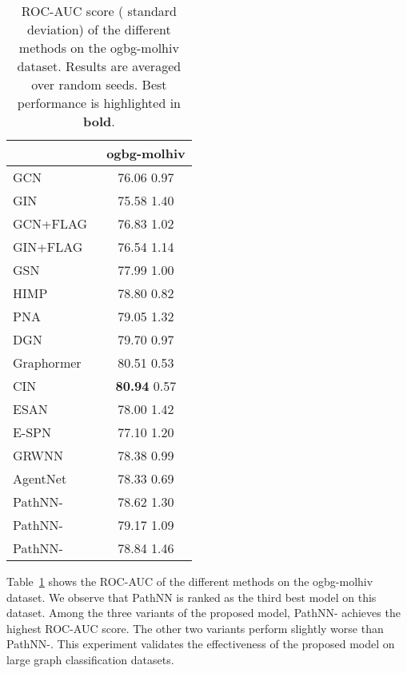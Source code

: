 \documentclass{article}
\theoremstyle{plain}
\theoremstyle{definition}
\theoremstyle{remark}
\begin{document}
\begin{table}[t]
\caption{ROC-AUC score ( standard deviation) of the different methods on the ogbg-molhiv dataset. Results are averaged over  random seeds. Best performance is highlighted in \textbf{bold}.}
\label{tab:results_ogb}
\centering
\scriptsize
\renewcommand{\arraystretch}{1.2}
\begin{tabular}{l|c}
\toprule
 & \textbf{ogbg-molhiv}  \\
\midrule
GCN~\cite{kipf2017semi} & 76.06  0.97 \\
GIN~\cite{xu2019powerful} & 75.58  1.40 \\
GCN+FLAG~\cite{kong2020flag} & 76.83  1.02 \\
GIN+FLAG~\cite{kong2020flag} & 76.54  1.14 \\
GSN~\cite{bouritsas2022improving} & 77.99  1.00 \\
HIMP~\cite{fey2020hierarchical} & 78.80  0.82 \\
PNA~\cite{corso2020principal} & 79.05  1.32 \\
DGN~\cite{beaini2021directional} & 79.70  0.97 \\
Graphormer~\cite{ying2021transformers} & 80.51  0.53 \\
CIN~\cite{bodnar2021weisfeiler2} & \textbf{80.94}  0.57 \\ 
ESAN~\cite{bevilacqua2022equivariant} & 78.00  1.42 \\
E-SPN~\cite{abboud2022shortest} & 77.10  1.20 \\
GRWNN~\cite{nikolentzos2023geometric} & 78.38  0.99 \\
AgentNet~\cite{martinkus2023agent} & 78.33  0.69 \\
\midrule
PathNN-  & 78.62  1.30 \\
PathNN-  & 79.17  1.09 \\
PathNN-  & 78.84  1.46 \\
\bottomrule
\end{tabular}
\end{table}

Table~\ref{tab:results_ogb} shows the ROC-AUC of the different methods on the ogbg-molhiv dataset.
We observe that PathNN is ranked as the third best model on this dataset.
Among the three variants of the proposed model, PathNN- achieves the highest ROC-AUC score.
The other two variants perform slightly worse than PathNN-.
This experiment validates the effectiveness of the proposed model on large graph classification datasets.
\end{document}
